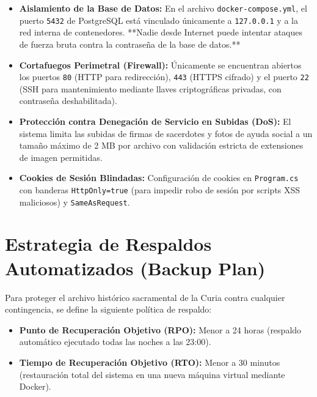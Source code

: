 \documentclass[11pt,a4paper]{article}
\begin{document}
\begin{itemize}[leftmargin=1.2cm]
    \item \textbf{Aislamiento de la Base de Datos:} En el archivo \texttt{docker-compose.yml}, el puerto \texttt{5432} de PostgreSQL está vinculado únicamente a \texttt{127.0.0.1} y a la red interna de contenedores. **Nadie desde Internet puede intentar ataques de fuerza bruta contra la contraseña de la base de datos.**
    \item \textbf{Cortafuegos Perimetral (Firewall):} Únicamente se encuentran abiertos los puertos \texttt{80} (HTTP para redirección), \texttt{443} (HTTPS cifrado) y el puerto \texttt{22} (SSH para mantenimiento mediante llaves criptográficas privadas, con contraseña deshabilitada).
    \item \textbf{Protección contra Denegación de Servicio en Subidas (DoS):} El sistema limita las subidas de firmas de sacerdotes y fotos de ayuda social a un tamaño máximo de 2 MB por archivo con validación estricta de extensiones de imagen permitidas.
    \item \textbf{Cookies de Sesión Blindadas:} Configuración de cookies en \texttt{Program.cs} con banderas \texttt{HttpOnly=true} (para impedir robo de sesión por scripts XSS maliciosos) y \texttt{SameAsRequest}.
\end{itemize}

\section{Estrategia de Respaldos Automatizados (Backup Plan)}

Para proteger el archivo histórico sacramental de la Curia contra cualquier contingencia, se define la siguiente política de respaldo:

\begin{itemize}[leftmargin=1.5cm]
    \item \textbf{Punto de Recuperación Objetivo (RPO):} Menor a 24 horas (respaldo automático ejecutado todas las noches a las 23:00).
    \item \textbf{Tiempo de Recuperación Objetivo (RTO):} Menor a 30 minutos (restauración total del sistema en una nueva máquina virtual mediante Docker).
\end{itemize}
\end{document}
